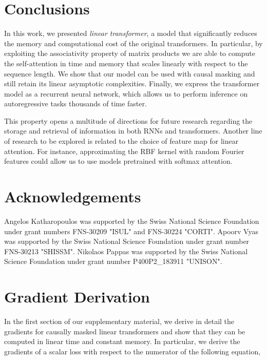 \documentclass{article}
\newcommand{\linear}{\emph{linear transformer}}
\begin{document}
\section{Conclusions}

In this work, we presented \linear{}, a model that significantly
reduces the memory and computational cost of the original transformers. In
particular, by exploiting the associativity property of matrix products we are
able to compute the self-attention in time and memory that scales linearly with
respect to the sequence length. We show that our model can be used with causal
masking and still retain its linear asymptotic complexities. Finally, we
express the transformer model as a recurrent neural network, which allows us to
perform inference on autoregressive tasks thousands of time faster.

This property opens a multitude of directions for future research regarding the
storage and retrieval of information in both RNNs and transformers. Another
line of research to be explored is related to the choice of feature map for
linear attention. For instance, approximating the RBF kernel with random
Fourier features could allow us to use models pretrained with softmax
attention.

\section*{Acknowledgements}

Angelos Katharopoulos was supported by the Swiss National Science Foundation
under grant numbers FNS-30209 "ISUL" and FNS-30224 "CORTI". Apoorv Vyas was
supported by the Swiss National Science Foundation under grant number FNS-30213
"SHISSM". Nikolaos Pappas was supported by the Swiss National Science
Foundation under grant number P400P2\_183911 "UNISON".





\appendix
\onecolumn
{}
\section{Gradient Derivation}

In the first section of our supplementary material, we derive in detail the
gradients for causally masked linear transformers and show that they can be
computed in linear time and constant memory. In particular, we derive the
gradients of a scalar loss with respect to the numerator of the following
equation,
\end{document}
